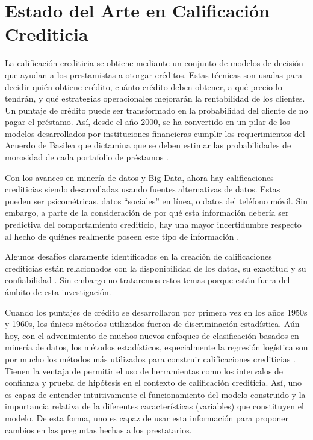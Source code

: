 \chapter{Estado del Arte en Calificación Crediticia}

La calificación crediticia se obtiene mediante un conjunto de modelos de decisión que ayudan a los prestamistas a otorgar créditos. Estas técnicas son usadas para decidir quién obtiene crédito, cuánto crédito deben obtener, a qué precio lo tendrán, y qué estrategias operacionales mejorarán la rentabilidad de los clientes. Un puntaje de crédito puede ser transformado en la probabilidad del cliente de no pagar el préstamo. Así, desde el año 2000, se ha convertido en un pilar de los modelos desarrollados por instituciones financieras cumplir los requerimientos del Acuerdo de Basilea que dictamina que se deben estimar las probabilidades de morosidad de cada portafolio de préstamos \citep[1]{thomas2017credit}.

Con los avances en minería de datos y Big Data, ahora hay calificaciones crediticias siendo desarrolladas usando fuentes alternativas de datos. Estas pueden ser psicométricas, datos ``sociales'' en línea, o datos del teléfono móvil. Sin embargo, a parte de la consideración de por qué esta información debería ser predictiva del comportamiento crediticio, hay una mayor incertidumbre respecto al hecho de quiénes realmente poseen este tipo de información \citep[18]{thomas2017credit}.

Algunos desafíos claramente identificados en la creación de calificaciones crediticias están relacionados con la disponibilidad de los datos, su exactitud y su confiabilidad \citep[18--19]{thomas2017credit}. Sin embargo no trataremos estos temas porque están fuera del ámbito de esta investigación.

Cuando los puntajes de crédito se desarrollaron por primera vez en los años 1950s y 1960s, los únicos métodos utilizados fueron de discriminación estadística. Aún hoy, con el advenimiento de muchos nuevos enfoques de clasificación basados en minería de datos, los métodos estadísticos, especialmente la regresión logística son por mucho los métodos más utilizados para construir calificaciones crediticias \citep[25]{thomas2017credit}. Tienen la ventaja de permitir el uso de herramientas como los intervalos de confianza y prueba de hipótesis en el contexto de calificación crediticia. Así, uno es capaz de entender intuitivamente el funcionamiento del modelo construido y la importancia relativa de la diferentes características (variables) que constituyen el modelo. De esta forma, uno es capaz de usar esta información para proponer cambios en las preguntas hechas a los prestatarios.

